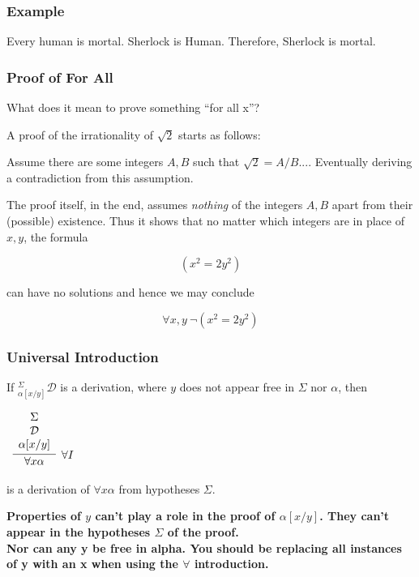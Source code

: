 \documentclass{beamer}
\theoremstyle{indentDefn} \newtheorem{defn}[]{Definition}
\begin{document}
\begin{frame}
	\frametitle{Example}
	
	Every human is mortal. Sherlock is Human. Therefore, Sherlock is mortal. 
	
	\vspace{6cm}
	
\end{frame}

\begin{frame}
	\frametitle{Proof of For All}
	
	What does it mean to prove something ``for all x''?
	
	A proof of the irrationality of $\sqrt{2}$ starts as follows: 
	
	\begin{center}
		Assume there are some integers $A,B$ such that $\sqrt{2} = A/B$.... Eventually deriving a contradiction from this assumption.
	\end{center}
	
	The proof itself, in the end, assumes \emph{nothing} of the integers $A,B$ apart from their (possible) existence. Thus it shows that no matter which integers are in place of $x,y$, the formula 
	
	$$(x^{2} = 2y^{2})$$
	
	can have no solutions and hence we may conclude 
	
	$$\forall x,y \ \lnot (x^{2} = 2y^{2})$$
	
\end{frame}

\begin{frame}
	\frametitle{Universal Introduction}
	
	If $^{\Sigma}_{\alpha[x/y]}\mathcal{D}$ is a derivation, where $y$ does not appear free in $\Sigma$ nor $\alpha$, then
	
	\vspace{0.5cm}
	
	\begin{center}
		$\begin{array}{c}
		\infer[\forall I]{\forall x \alpha}{\begin{array}{c} 
			\Sigma \\
			\mathcal{D} \\ 
			\alpha[x/y]
			\end{array}}
		\end{array}$
	\end{center}
	
	is a derivation of $\forall x \alpha$ from hypotheses $\Sigma$. 
	
	\vspace{0.5cm} 
	
	{\bf Properties of $y$ can't play a role in the proof of $\alpha[x/y]$. They can't appear in the hypotheses $\Sigma$ of the proof.} \\
	
	{\bf Nor can any y be free in alpha. You should be replacing all instances of y with an x when using the $\forall$ introduction.}
	
\end{frame}
\end{document}
